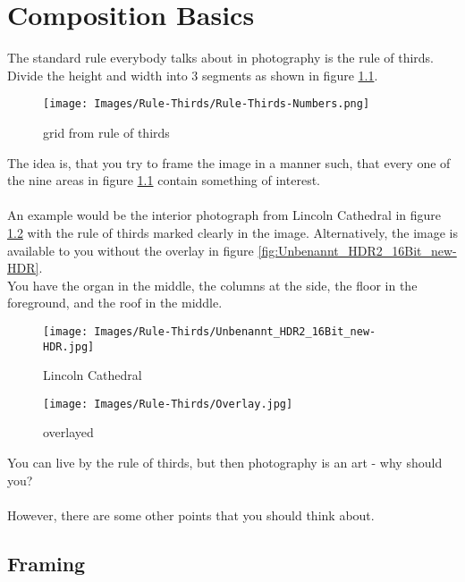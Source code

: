 \chapter{Composition Basics}

The standard rule everybody talks about in photography is the rule of thirds. Divide the height and width into 3 segments as shown in figure \ref{fig:Rule-Thirds-Numbers}.

\begin{figure}[htbp]
	\centering
		\texttt{[image: Images/Rule-Thirds/Rule-Thirds-Numbers.png]}
	\caption{grid from rule of thirds}
	\label{fig:Rule-Thirds-Numbers}
\end{figure}

The idea is, that you try to frame the image in a manner such, that every one of the nine areas in figure \ref{fig:Rule-Thirds-Numbers} contain something of interest.
\\
\\
An example would be the interior photograph from Lincoln Cathedral in figure \ref{fig:Overlay} with the rule of thirds marked clearly in the image. Alternatively, the image is available to you without the overlay in figure \ref{fig:Unbenannt_HDR2_16Bit_new-HDR}.
\\
You have the organ in the middle, the columns at the side, the floor in the foreground, and the roof in the middle.

\begin{figure}[htbp]
\begin{minipage}{.4\textwidth}
	\centering
		\texttt{[image: Images/Rule-Thirds/Unbenannt\_HDR2\_16Bit\_new-HDR.jpg]}
	\caption{Lincoln Cathedral}
	\label{fig:Unbenannt_HDR2_16Bit_new-HDR}
\end{minipage}
\begin{minipage}{.4\textwidth}
	\centering
		\texttt{[image: Images/Rule-Thirds/Overlay.jpg]}
	\caption{overlayed}
	\label{fig:Overlay}
\end{minipage}
\end{figure}


You can live by the rule of thirds, but then photography is an art - why should you?
\\
\\
However, there are some other points that you should think about.

\section{Framing}


